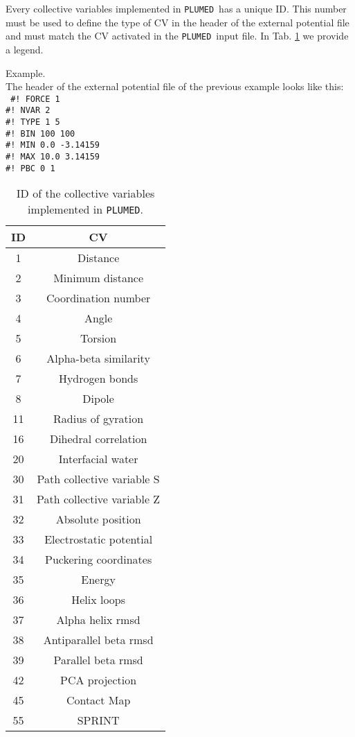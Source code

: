 \documentclass[12pt,fleqn]{report}
\newcommand{\plumed}{{\tt PLUMED}}
\newcommand{\esempio}[1]{
\vspace{10pt}
\begin{flushright}
\colorbox{light-gray}{
   \begin{minipage}{13cm}
       \scriptsize{
{\fontfamily{phv} \fontseries{b}
 \selectfont Example. \\
 \fontseries{m} \selectfont #1 } }
\end{minipage}}
\end{flushright}
\vspace{20pt}
}
\begin{document}
Every collective variables implemented in \plumed \ has a unique ID. 
This number must be used to define the type of CV in the header of the external
potential file and must match the CV activated in the \plumed \ input file. 
In Tab. \ref{id_cv} we provide a legend. 

\esempio{
The header of the external potential file of the previous example
looks like this: \vspace{10pt} \\
{\tt
\#! FORCE 1 \\
\#! NVAR  2 \\
\#! TYPE   1    5 \\
\#! BIN  100  100 \\
\#! MIN  0.0  -3.14159 \\
\#! MAX 10.0   3.14159 \\
\#! PBC    0    1 
}
}

\begin{table}
\begin{center}
\begin{tabular}{ c | c }
  {\bf ID}    & {\bf CV}  \\
\hline
1   & Distance\\
2   & Minimum distance\\
3   & Coordination number\\
4   & Angle\\
5   & Torsion\\
6   & Alpha-beta similarity\\
7   & Hydrogen bonds\\
8   & Dipole\\ 
11  & Radius of gyration\\
16  & Dihedral correlation\\
20  & Interfacial water\\
30  & Path collective variable S\\
31  & Path collective variable Z\\
32  & Absolute position\\
33  & Electrostatic potential\\
34  & Puckering coordinates\\
35  & Energy\\
36  & Helix loops \\
37  & Alpha helix rmsd \\
38  & Antiparallel beta rmsd \\
39  & Parallel beta rmsd \\
42  & PCA projection\\
45  & Contact Map\\
55  & SPRINT \\
\hline
\end{tabular}
\caption{ID of the collective variables implemented in \plumed.}\label{id_cv}
\end{center}
\end{table}
\end{document}
